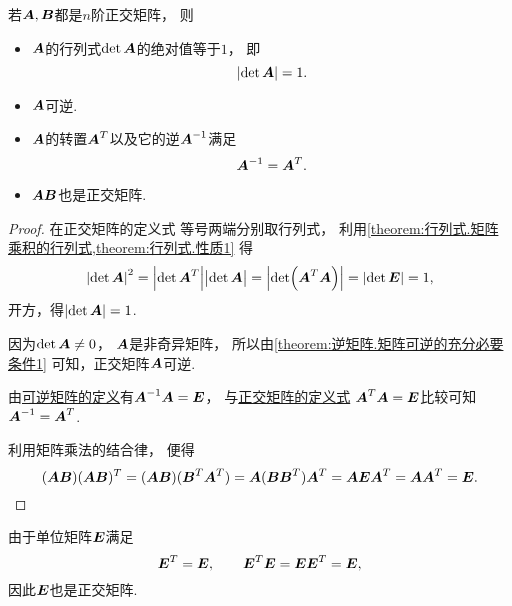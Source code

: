 \begin{property}
若\(\boldsymbol{A},\boldsymbol{B}\)都是\(n\)阶正交矩阵，
则\begin{itemize}
	\item \(\boldsymbol{A}\)的行列式\(\det\boldsymbol{A}\)的绝对值等于\(1\)，
	即\begin{equation}\label{equation:正交矩阵.正交矩阵的行列式}
		\abs{\det\boldsymbol{A}}=1.
	\end{equation}

	\item \(\boldsymbol{A}\)可逆.

	\item \(\boldsymbol{A}\)的转置\(\boldsymbol{A}^T\)以及它的逆\(\boldsymbol{A}^{-1}\)满足
	\begin{equation}\label{equation:正交矩阵.正交矩阵的转置等于正交矩阵的逆}
		\boldsymbol{A}^{-1}=\boldsymbol{A}^T.
	\end{equation}

	\item \(\boldsymbol{A}\boldsymbol{B}\)也是正交矩阵.
\end{itemize}
\begin{proof}
在正交矩阵的定义式  等号两端分别取行列式，
利用\cref{theorem:行列式.矩阵乘积的行列式,theorem:行列式.性质1} 得\begin{equation*}
	\abs{\det\boldsymbol{A}}^2
	=\abs{\det\boldsymbol{A}^T} \abs{\det\boldsymbol{A}\vphantom{^T}}
	=\abs{\det(\boldsymbol{A}^T \boldsymbol{A})}
	=\abs{\det\boldsymbol{E}}
	=1,
\end{equation*}
开方，得\(\abs{\det\boldsymbol{A}}=1\).

因为\(\det\boldsymbol{A}\neq0\)，
\(\boldsymbol{A}\)是非奇异矩阵，
所以由\cref{theorem:逆矩阵.矩阵可逆的充分必要条件1} 可知，正交矩阵\(\boldsymbol{A}\)可逆.

由\hyperref[definition:可逆矩阵.可逆矩阵的定义]{可逆矩阵的定义}有\(\boldsymbol{A}^{-1}\boldsymbol{A}=\boldsymbol{E}\)，
与\hyperref[equation:正交矩阵.正交矩阵的定义式]{正交矩阵的定义式}
\(\boldsymbol{A}^T\boldsymbol{A}=\boldsymbol{E}\)比较可知\(\boldsymbol{A}^{-1}=\boldsymbol{A}^T\).

利用矩阵乘法的结合律，
便得\begin{equation*}
	(\boldsymbol{A}\boldsymbol{B})(\boldsymbol{A}\boldsymbol{B})^T
	= (\boldsymbol{A}\boldsymbol{B})(\boldsymbol{B}^T\boldsymbol{A}^T)
	= \boldsymbol{A}(\boldsymbol{B}\boldsymbol{B}^T)\boldsymbol{A}^T
	= \boldsymbol{A}\boldsymbol{E}\boldsymbol{A}^T
	= \boldsymbol{A}\boldsymbol{A}^T
	= \boldsymbol{E}.
	\qedhere
\end{equation*}
\end{proof}
\end{property}

\begin{example}
由于单位矩阵\(\boldsymbol{E}\)满足\begin{equation*}
	\boldsymbol{E}^T=\boldsymbol{E}, \qquad
	\boldsymbol{E}^T \boldsymbol{E} = \boldsymbol{E} \boldsymbol{E}^T = \boldsymbol{E},
\end{equation*}
因此\(\boldsymbol{E}\)也是正交矩阵.
\end{example}

